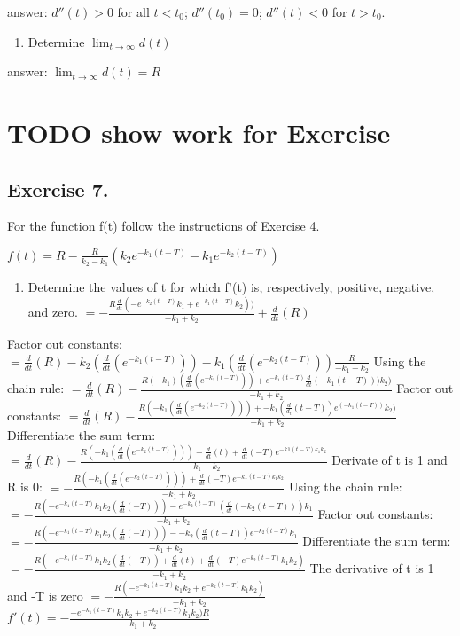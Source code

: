 \documentclass[]{article}
\providecommand{\tightlist}{%
  \setlength{\itemsep}{0pt}\setlength{\parskip}{0pt}}
\begin{document}
answer: \(d''(t) > 0\) for all \(t < t_0\); \(d''(t_0) =0\);
\(d''(t) < 0\) for \(t > t_0\).

\begin{enumerate}
\def\labelenumi{(\alph{enumi})}
\setcounter{enumi}{2}
\tightlist
\item
  Determine \(\lim_{t\to\infty}d(t)\)
\end{enumerate}

answer: \(\lim_{t\to\infty}d(t) =R\)

\section{TODO show work for
Exercise}\label{todo-show-work-for-exercise-1}

\subsection{Exercise 7.}\label{exercise-7.}

For the function f(t) follow the instructions of Exercise 4.

\(f(t) = R - \frac{R}{k_2 - k_1}(k_2 e^{-k_1(t-T)}-k_1 e^{-k_2(t-T)})\)

\begin{enumerate}
\def\labelenumi{(\alph{enumi})}
\tightlist
\item
  Determine the values of t for which f'(t) is, respectively, positive,
  negative, and zero.
  \(=- \frac{R \frac{d}{dt}(-e^{-k_2 (t-T)}k_1 + e^{-k_1(t - T)}k_2))}{-k_1 + k_2} + \frac{d}{dt}(R)\)
\end{enumerate}

Factor out constants:
\(=\frac{d}{dt}(R) - k_2(\frac{d}{dt}(e^{-k_1(t - T)})) - k_1 (\frac{d}{dt}(e^{-k_2(t-T)})) \frac{R}{-k_1 + k_2}\)
Using the chain rule:
\(=\frac{d}{dt}(R)-\frac{R(-k_1)(\frac{d}{dt}(e^{-k_2(t-T)})) + e^{-k_1(t-T)}\frac{d}{dt}(-k_1(t-T)))k_2)}{-k_1+ k_2}\)
Factor out constants:
\(=\frac{d}{dt}(R) - \frac{R(-k_1(\frac{d}{dt}(e^{-k_2(t-T)})))+-k_1(\frac{d}{d_t}(t-T))e^(-k_1(t-T))k_2)}{-k_1 + k_2}\)
Differentiate the sum term:
\(=\frac{d}{dt}(R) - \frac{R(-k_1(\frac{d}{dt}(e^{-k_2(t-T)})))+ \frac{d}{dt}(t) + \frac{d}{dt}(-T)e^{-k1(t-T)k_1 k_2}}{-k_1 + k_2}\)
Derivate of t is 1 and R is 0:
\(=- \frac{R(-k_1(\frac{d}{dt}(e^{-k_2(t-T)})))+ \frac{d}{dt}(-T)e^{-k1(t-T)k_1 k_2}}{-k_1 + k_2}\)
Using the chain rule:
\(=-\frac{R(-e^{-k_1 (t-T)}k_1 k_2(\frac{d}{dt}(-T)))- e^{-k_2(t-T)}(\frac{d}{dt}(-k_2(t-T)))k_1}{-k_1 + k_2}\)
Factor out constants:
\(=-\frac{R(-e^{-k_1 (t-T)}k_1 k_2(\frac{d}{dt}(-T)))- -k_2(\frac{d}{dt}(t-T))e^{-k_2 (t-T)}k_1}{-k_1 + k_2}\)
Differentiate the sum term:
\(=-\frac{R(-e^{-k_1(t-T)}k_1 k_2(\frac{d}{dt}(-T)) + \frac{d}{dt}(t)+\frac{d}{dt}(-T)e^{-k_2(t-T)}k_1 k_2)}{-k_1 + k_2}\)
The derivative of t is 1 and -T is zero
\(=-\frac{R(-e^{-k_1(t-T)}k_1 k_2 + e^{-k_2(t-T)}k_1 k_2)}{-k_1 + k_2}\)
\(f'(t)=-\frac{-e^{-k_1 (t -T)}k_1 k_2 + e^{-k_2(t-T)}k_1 k_2)R}{-k_1 + k_2}\)
\end{document}
